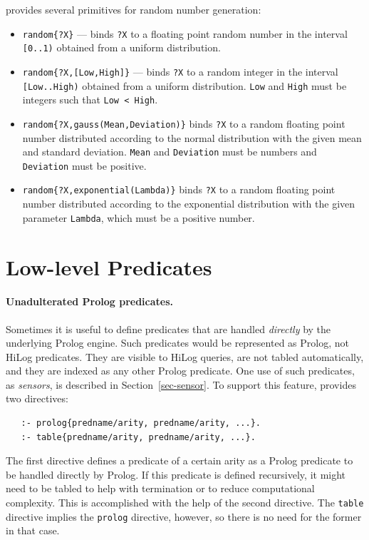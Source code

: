 \documentclass[11pt]{article}
\newcommand{\ERGO}{\mbox{\smaller{\ensuremath{\cal{E}}\smaller{{\sc{RGO}}}}}\xspace}
\newcommand{\FLSYSTEM}{\ERGO}
\begin{document}
\FLSYSTEM provides several primitives for random number generation:
\begin{itemize}
\item  \texttt{random\{?X\}} --- binds \texttt{?X} to a floating point
  random number in the interval \texttt{[0..1)}  
  obtained from a uniform distribution.
\item \texttt{random\{?X,[Low,High]\}} --- binds \texttt{?X} to a random
  integer in the interval \texttt{[Low..High)}  
  obtained from a uniform distribution. \texttt{Low} and \texttt{High} must
  be integers such that \texttt{Low < High}.
\item \texttt{random\{?X,gauss(Mean,Deviation)\}} binds \texttt{?X} to a random
  floating point number distributed according to the normal distribution
  with the given mean and standard deviation.
  \texttt{Mean} and \texttt{Deviation} must be numbers and
  \texttt{Deviation} must be positive.   
\item \texttt{random\{?X,exponential(Lambda)\}} binds \texttt{?X} to a random
  floating point number distributed according to the exponential distribution
  with the given parameter \texttt{Lambda}, which must be a positive
  number.
\end{itemize}

\section{Low-level Predicates}
\label{sec-lowlevel}

\paragraph{Unadulterated Prolog predicates.}
Sometimes it is useful to define predicates that are handled
\emph{directly} by the underlying Prolog engine. Such predicates would be
represented as Prolog, not HiLog predicates. They are visible to
HiLog queries, are not tabled automatically,
and they are indexed as any other Prolog predicate.
One use of such predicates, as \emph{sensors}, is described in
Section~\ref{sec-sensor}.
To support this feature, \FLSYSTEM provides two directives:
\begin{verbatim}
   :- prolog{predname/arity, predname/arity, ...}.
   :- table{predname/arity, predname/arity, ...}.
\end{verbatim}
The first directive defines a predicate of a certain arity as a Prolog
predicate to be handled directly by Prolog. If this predicate is defined
recursively, it might need to be tabled to help with termination or to
reduce computational complexity. This is accomplished with the help of the
second directive. The \texttt{table} directive implies the \texttt{prolog}
directive, however, so there is no need for the former in that case.
\end{document}
